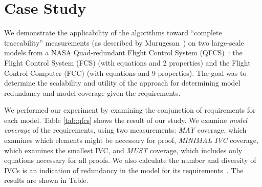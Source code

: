 \section{Case Study}

\label{sec:qfc}
We demonstrate the applicability of the algorithms toward ``complete traceability'' measurements (as described by Murugesan~\cite{Murugesan16:renext}) on two large-scale models from a NASA Quad-redundant Flight Control System (QFCS)~\cite{NFM2015:backes}: the Flight Control System (FCS) (with  equations and 2 properties) and the Flight Control Computer (FCC) (with  equations and 9 properties).  The goal was to determine the scalability and utility of the approach for determining model redundancy and model coverage given the requirements.

We performed our experiment by examining the conjunction of requirements for each model. Table \ref{tab:qfcs} shows the result of our study.  We examine {\em model coverage} of the requirements, using two measurements: {\em MAY} coverage, which examines which elements might be necessary for proof, {\em MINIMAL IVC} coverage, which examines the smallest IVC, and {\em MUST} coverage, which includes only equations necessary for all proofs.  We also calculate the number and diversity of IVCs is an indication of redundancy in the model for its requirements~. The results are shown in Table. 


\iffalse
For each model. when the \aivcalg\ did not terminate before 4 hours, its runtime is shown with incomplete. \ela{we can explain a bit the numbers and table here, then get to coverage}

As mentioned in Section~\ref{sec:intro}, proof-based coverage analysis is one important application of all minimal IVCs. The goal of a
coverage metric is usually to assign a numeric score that de-
scribes how well properties cover the design. The majority of
the work on coverage metrics has focused on mutations, which
are “atomic” changes to the design, where the set of possible
mutations depends on the notation that is used. For large models, mutation-based coverage is quite inefficient. Having all minimal IVCs, we can easily formalize a family of proof-based metrics. For example, owe could define two distinct coverage metrics as follows:
\ela{choose two metric that I can calculate: we could choose must and may since you also talk about them in the introduction}
\fi

